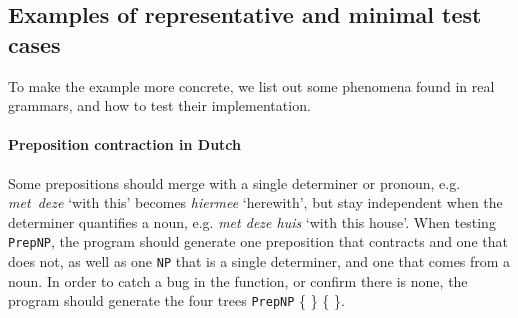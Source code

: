 \documentclass[11pt]{article}
\def\t#1{\texttt{#1}}
\begin{document}
\subsection{Examples of representative and minimal test cases} 
To make the example more concrete, we list out some phenomena found in real grammars, and how to test their implementation.

\paragraph{Preposition contraction in Dutch} Some prepositions should merge with a single determiner or pronoun, e.g. \emph{met~deze} `with this' becomes \emph{hiermee} `herewith', but stay independent when the determiner quantifies a noun, e.g. \emph{met deze huis} `with this house'. When testing \t{PrepNP}, the program should generate one preposition that contracts and one that does not, as well as one \t{NP} that is a single determiner, and one that comes from a noun. 
In order to catch a bug in the function, or confirm there is none, the program should generate the four trees
\t{PrepNP} \{  \} \{  \}. 
\end{document}

